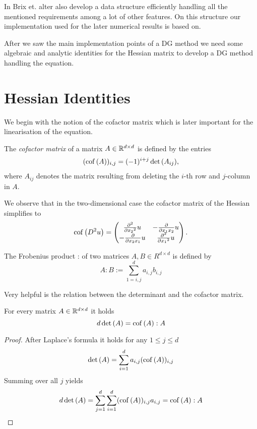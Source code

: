 In \cite{BMV2009} Brix et. alter also develop a data structure efficiently handling all the mentioned requirements among a lot of other features. On this structure our implementation used for the later numerical results is based on.

After we saw the main implementation points of a DG method we need some algebraic and analytic identities for the Hessian matrix to develop a DG method handling the \MA equation.
\section{Hessian Identities}

We begin with the notion of the cofactor matrix which is later important for the linearisation of the \MA equation.
\begin{definition} \label{def: cof matrix}
	The \emph{cofactor matrix} of a matrix $A \in \mathbb{R}^{d \times d}$ is defined by the entries
	\begin{align}
	(\operatorname{cof} \left( A \right) )_{i,j} = (-1)^{i+j} \det{\left(A_{ij}\right)},
	\end{align}
	where $A_{ij}$ denotes the matrix resulting from deleting the $i$-th row and $j$-column in $A$.
\end{definition}

We observe that in the two-dimensional case the cofactor matrix of the Hessian simplifies to
\begin{align}
\operatorname{cof} \left( D^2 u \right) = \begin{pmatrix}
								\frac {\partial^2} {\partial {x_2}^2} u & -\frac {\partial }{\partial x_1 x_2} u\\
								-\frac {\partial }{\partial x_2 x_1} u & \frac {\partial^2} {\partial {x_1}^2} u
							\end{pmatrix}.
\end{align}

\begin{definition}
	The Frobenius product : of two matrices $A, B \in R^{d \times d}$ is defined by
	\[
		A:B := \sum_{1 = i,j} ^d a_{i,j} b_{i,j}
	\]
\end{definition}

Very helpful is the relation between the determinant and the cofactor matrix.
\begin{lemma}\label{la: rel det cofactor}
	For every matrix $A  \in \mathbb{R}^{d \times d}$ it holds
	\[
		d \det{\left(A\right)} = \operatorname{cof} \left( A \right): A
	\]
\end{lemma}
\begin{proof}
	After Laplace's formula it holds for any $1 \leq j \leq d$
	\[
		\det{\left(A\right)} = \sum\limits_{i = 1}^{d} a_{i,j} (\operatorname{cof} \left( A \right) )_{i,j} 
	\]
	Summing over all $j$ yields
	\[
		d \det{\left(A\right)} = \sum\limits_{j= 1}^{d} \sum\limits_{i = 1}^{d} (\operatorname{cof} \left( A \right) )_{i,j}  a_{i,j}  = \operatorname{cof} \left( A \right): A
	\]
\end{proof}

